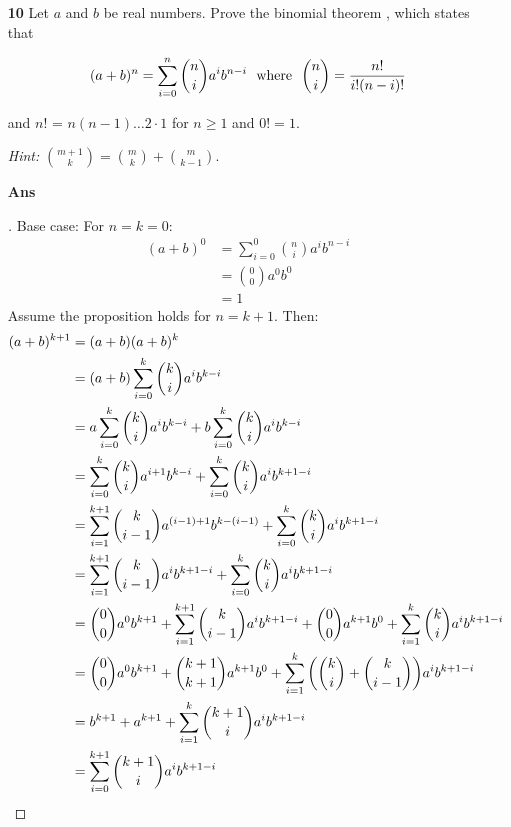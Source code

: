 \documentclass[paper=usletter, fontsize=12pt]{article}
\begin{document}
\begin{itemize}
\begin{itemize}
\begin{enumerate}
            \end{enumerate}

            \item[\textbf{10}] Let $a$ and $b$ be real numbers. Prove the
            binomial theorem , which states that

                \[ (a+b)^n = \sum_{i=0}^{n} \binom{n}{i}a^{i}b^{n-i} \text{\ \
                where \ } \binom{n}{i}=\frac{n!}{i!(n-i)!} \]

            and $n!$ = $n(n-1)\ldots 2 \cdot 1$ for $n \ge 1$ and $0! = 1$.

            \textit{Hint:} $\binom{m+1}{k}=\binom{m}{k}+\binom{m}{k-1}$.
            \item[\textbf{Ans}]
            \begin{proof}[\unskip\nopunct]
                Base case: For $n = k = 0$:
                \begin{align*}
                    (a + b)^0 & = \sum_{i=0}^{0} \binom{n}{i}a^{i}b^{n-i} \\
                    & = \binom{0}{0}a^{0}b^{0} \\
                    & = 1
                \end{align*}
                Assume the proposition holds for $n = k + 1$. Then:
                \begin{align*}
                    (a + b)^{k+1} & = (a + b)(a + b)^{k} \\
                    & = (a + b)\sum_{i=0}^{k} \binom{k}{i}a^{i}b^{k-i} \\
                    & = a\sum_{i=0}^{k} \binom{k}{i}a^{i}b^{k-i} +
                    b\sum_{i=0}^{k} \binom{k}{i}a^{i}b^{k-i} \\
                    & = \sum_{i=0}^{k} \binom{k}{i}a^{i+1}b^{k-i} +
                    \sum_{i=0}^{k} \binom{k}{i}a^{i}b^{k+1-i} \\
                    & = \sum_{i=1}^{k+1} \binom{k}{i-1}a^{(i-1)+1}b^{k-(i-1)} +
                    \sum_{i=0}^{k} \binom{k}{i}a^{i}b^{k+1-i} \\
                    & = \sum_{i=1}^{k+1} \binom{k}{i-1}a^{i}b^{k+1-i} +
                    \sum_{i=0}^{k} \binom{k}{i}a^{i}b^{k+1-i} \\
                    & = \binom{0}{0}a^{0}b^{k+1} + \sum_{i=1}^{k+1}
                    \binom{k}{i-1}a^{i}b^{k+1-i} + \binom{0}{0}a^{k+1}b^{0} +
                    \sum_{i=1}^{k} \binom{k}{i}a^{i}b^{k+1-i} \\
                    & = \binom{0}{0}a^{0}b^{k+1} + \binom{k+1}{k+1}a^{k+1}b^{0}
                    + \sum_{i=1}^{k}\bigg(\binom{k}{i} +
                      \binom{k}{i-1}\bigg)a^{i}b^{k+1-i} \\
                    & = b^{k+1} + a^{k+1} + \sum_{i=1}^{k}
                    \binom{k+1}{i}a^{i}b^{k+1-i} \\
                    & = \sum_{i=0}^{k+1}\binom{k+1}{i}a^{i}b^{k+1-i} \qedhere
                \end{align*}
            \end{proof}
            \vspace{0.2in}


\end{itemize}
\end{itemize}
\end{document}
